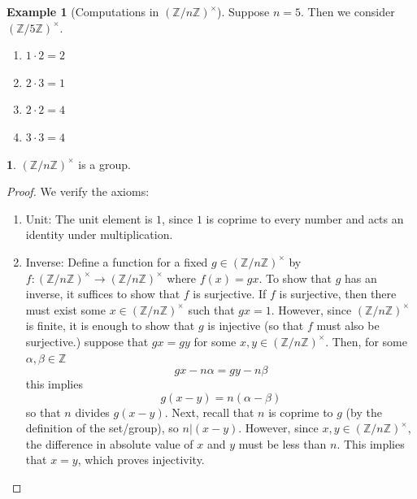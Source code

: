 \documentclass[12pt]{article}
\theoremstyle{definition}
\newtheorem{theorem}{\color{ForestGreen}{\textbf{Theorem}}}
\newtheorem{example}{\color{WildStrawberry}Example}
\theoremstyle{definition}
\begin{document}
\begin{example}[Computations in $(\mathbb{Z}/n \mathbb{Z})^{\times}$]
Suppose $n=5$. Then we consider $(\mathbb{Z}/5 \mathbb{Z})^{\times}$. 
\begin{enumerate}
	\item $1 \cdot 2 = 2$ 
	\item $2 \cdot 3 = 1$
	\item $2 \cdot 2 = 4$
	\item $3 \cdot 3 = 4$
\end{enumerate}
\end{example}

\begin{theorem}
$(\mathbb{Z}/n \mathbb{Z})^{\times}$ is a group.
\end{theorem}
\begin{proof}
We verify the axioms:
\begin{enumerate}
	\item Unit: The unit element is $1$, since $1$ is coprime to every number and acts an identity under multiplication.
	\item Inverse: Define a function for a fixed $g \in (\mathbb{Z}/n \mathbb{Z})^{\times}$ by $f : (\mathbb{Z}/n \mathbb{Z})^{\times} \to (\mathbb{Z}/n \mathbb{Z})^{\times}$ where $f(x) = gx$. To show that $g$ has an inverse, it suffices to show that $f$ is surjective. If $f$ is surjective, then there must exist some $x \in (\mathbb{Z}/n \mathbb{Z})^{\times}$ such that $gx = 1$. However, since $(\mathbb{Z}/n \mathbb{Z})^{\times}$ is finite, it is enough to show that $g$ is injective (so that $f$ must also be surjective.) suppose that $gx = gy$ for some $x,y \in (\mathbb{Z}/n \mathbb{Z})^{\times}$. Then, for some $\alpha, \beta \in \mathbb{Z}$
	\begin{equation}
		gx - n\alpha = gy - n\beta \tag{equality of integers}
	\end{equation}
	this implies
	\begin{equation}
		g(x-y) = n(\alpha - \beta)
	\end{equation}
	so that $n$ divides $g(x-y)$. Next, recall that $n$ is coprime to $g$ (by the definition of the set/group), so  $n | (x-y)$. However, since $x,y \in (\mathbb{Z}/n \mathbb{Z})^{\times}$, the difference in absolute value of $x$ and $y$ must be less than $n$. This implies that $x=y$, which proves injectivity.
\end{enumerate}
\end{proof}
\end{document}
